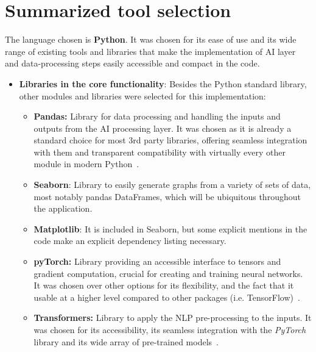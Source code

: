 \documentclass[a4paper, 11pt]{report}
\begin{document}
    \section{Summarized tool selection}
    The language chosen is \textbf{Python}. It was chosen for its ease of use and its wide range of existing tools and libraries that make the implementation of AI layer and data-processing steps easily accessible and compact in the code.
    \begin{itemize}
        \item \textbf{Libraries in the core functionality}: Besides the Python standard library, other modules and libraries were selected for this implementation:
        \begin{itemize}
            \item \textbf{Pandas:} Library for data processing and handling the inputs and outputs from the AI processing layer. It was chosen as it is already a standard choice for most 3rd party libraries, offering seamless integration with them and transparent compatibility with virtually every other module in modern Python~\cite{pandas_usermanual}.
            \item \textbf{Seaborn}: Library to easily generate graphs from a variety of sets of data, most notably pandas DataFrames, which will be ubiquitous throughout the application.~\cite{seaborn_usermanual, SeabornWaskom2021}
            \item \textbf{Matplotlib}: It is included in Seaborn, but some explicit mentions in the code make an explicit dependency listing necessary.
            \item \textbf{pyTorch:} Library providing an accessible interface to tensors and gradient computation, crucial for creating and training neural networks. It was chosen over other options for its flexibility, and the fact that it usable at a higher level compared to other packages (i.e. TensorFlow)~\cite{pytorch_usermanual}.
            \item \textbf{Transformers:} Library to apply the NLP pre-processing to the inputs. It was chosen for its accessibility, its seamless integration with the \textit{PyTorch} library and its wide array of pre-trained models~\cite{huggingface_transformers}.
        \end{itemize}


\end{itemize}
\end{document}
